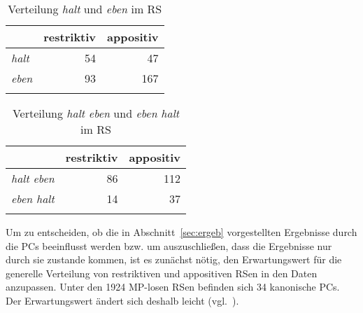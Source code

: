 \begin{table}
	\caption{\label{tab:803}Verteilung \textit{halt} und \textit{eben} im RS}
     \begin{tabular}{lrr}
     \lsptoprule
	 {} & restriktiv & appositiv\\
	 \midrule
	 \textit{halt} & 54 & 47\\
	 \textit{eben} & 93 & 167\\
	 \lspbottomrule
     \end{tabular}
\end{table}                    				

\begin{table}
	\caption{\label{tab:804}Verteilung \textit{halt eben} und \textit{eben halt} im RS}
     \begin{tabular}{lrr}
     \lsptoprule
	 {} & restriktiv & appositiv\\
	 \midrule
	 \textit{halt eben} & 86 & 112\\
	 \textit{eben halt} & 14 & 37\\
\lspbottomrule
     \end{tabular}
\end{table}                    				
Um zu entscheiden, ob die in Abschnitt~\ref{sec:ergeb} vorgestellten Ergebnisse durch die PCs beeinflusst werden bzw. um auszuschließen, dass die Ergebnisse nur durch sie zustande kommen, ist es zunächst nötig, den Erwartungswert für die generelle Verteilung von restriktiven und appositiven RSen in den Daten anzupassen. Unter den 1924 MP-losen RSen befinden sich 34 kanonische PCs. Der Erwartungswert ändert sich deshalb leicht (vgl.\ ).

